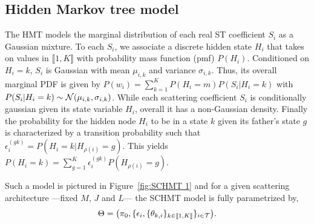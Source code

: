 \documentclass{article}
\begin{document}
  \subsection{Hidden Markov tree model}
    \label{subsec:SCHMT/HMT model}
    The HMT models the marginal distribution of each real ST coefficient $S_i$ as a Gaussian mixture. To each $S_i$, we associate a discrete hidden state $H_i$ that takes on values in $\llbracket 1,K \rrbracket$ with probability mass function (pmf) $P(H_i)$. Conditioned on $H_i = k$, $S_i$ is Gaussian with mean $\mu_{i,k}$ and variance $\sigma_{i,k}$. Thus, its overall marginal PDF is given by $P(w_i) = \sum_{k=1}^{K} P(H_i = m)P(S_i| H_i=k)$ with $P(S_i|H_i=k) \sim \mathcal{N}(\mu_{i,k}, \sigma_{i,k})$. While each scattering coefficient $S_i$ is conditionally gaussian given its state variable $H_i$, overall it has a non-Gaussian density. Finally the probability for the hidden node $H_{i}$ to be in a state $k$ given its father's state $g$ is characterized by a transition probability such that $\epsilon_{i}^{(gk)} = P(H_{i}= k | H_{\rho(i)}=g)$. This yields $P(H_{i}=k) = \sum_{g=1}^{K} \epsilon_{i}^{(gk)} P(H_{\rho(i)}=g)$.
    

    Such a model is pictured in Figure~\ref{fig:SCHMT 1} and for a given scattering architecture ---\ie fixed $M$, $J$ and $L$--- the SCHMT model is fully parametrized by,
    \vspace{-5pt}
    \begin{equation}
      \Theta = \big(\pi_{0}, \{ \epsilon_{i}, \{ \theta_{k,i} \}_{k\in\llbracket1,K\rrbracket} \}_{i\in\mathcal{T}}\big).
      \label{eq:SCHMT - parameters}
    \end{equation}
    \vspace{-15pt}
\end{document}
